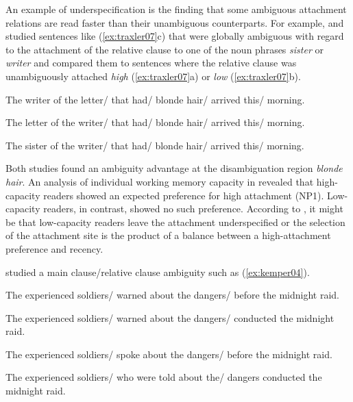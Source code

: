 \documentclass{cambridge7A}\usepackage[]{graphicx}\usepackage[]{color}
\begin{document}
An example of underspecification is the finding that some ambiguous attachment relations are read faster than their unambiguous counterparts. For example, \cite{TraxlerPickeringClifton1998} and \cite{Traxler2007} studied sentences like (\ref{ex:traxler07}c) that were globally ambiguous with regard to the attachment of the relative clause to one of the noun phrases \textit{sister} or \textit{writer} and compared them to sentences where the relative clause was unambiguously attached \emph{high} (\ref{ex:traxler07}a) or \emph{low} (\ref{ex:traxler07}b).

\begin{exe}
\ex\label{ex:traxler07}
\begin{xlist}
\item The writer of the letter/ that had/ blonde hair/ arrived this/ morning.
\item The letter of the writer/ that had/ blonde hair/ arrived this/ morning.
\item The sister of the writer/ that had/ blonde hair/ arrived this/ morning.
\end{xlist}
\end{exe}

Both studies found an ambiguity advantage at the disambiguation region \textit{blonde hair}. An analysis of individual working memory capacity in \cite{Traxler2007} revealed that  high-capacity readers showed an expected preference for high attachment (NP1).  
Low-capacity readers, in contrast, showed no such preference. According to \cite{Traxler2007}, it might be that low-capacity readers leave the attachment underspecified or the selection of the attachment site is the product of a balance between a high-attachment preference and recency.

\cite{KemperCrowKemtes2004} studied a main clause/relative clause ambiguity such as (\ref{ex:kemper04}). 

\begin{exe}
\ex\label{ex:kemper04}
\begin{xlist}
\item The experienced soldiers/ warned about the dangers/ before the midnight raid.
\item The experienced soldiers/ warned about the dangers/ conducted the midnight raid.
\item The experienced soldiers/ spoke about the dangers/ before the midnight raid.
\item The experienced soldiers/ who were told about the/ dangers conducted the midnight raid.
\end{xlist}
\end{exe}
\end{document}
